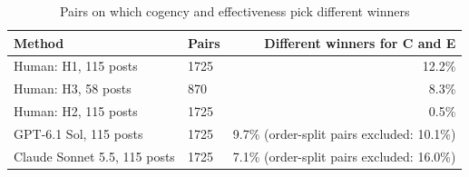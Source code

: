 \begin{table}[htbp]
\centering
\small
\caption{Pairs on which cogency and effectiveness pick different winners}
\label{tab:S3_discordance}
\begin{tabular}{llr}
\toprule
Method & Pairs & Different winners for C and E \\
\midrule
Human: H1, 115 posts & 1725 & 12.2\% \\
Human: H3, 58 posts & 870 & 8.3\% \\
Human: H2, 115 posts & 1725 & 0.5\% \\
GPT-6.1 Sol, 115 posts & 1725 & 9.7\% (order-split pairs excluded: 10.1\%) \\
Claude Sonnet 5.5, 115 posts & 1725 & 7.1\% (order-split pairs excluded: 16.0\%) \\
\bottomrule
\end{tabular}
\end{table}
